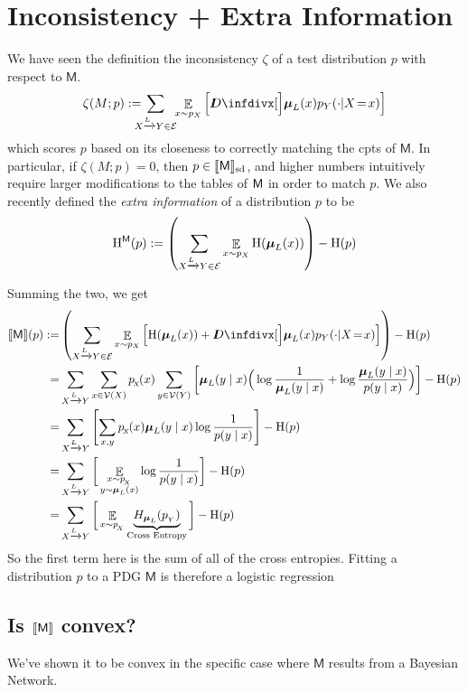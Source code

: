 \documentclass{article}
\newcommand{\bmu}{\boldsymbol{\mu}}
\newcommand{\V}{\mathcal V}
\newcommand{\Ed}{\mathcal E}
\newcommand{\sfM}{\mathsf M}
\newcommand\SD{_{\text{sd}}}
\begin{document}
    \section{Inconsistency + Extra Information}
    We have seen the definition the inconsistency $\zeta$ of a test distribution $p$ with respect to $\sfM$.
    \[
        \zeta(M ; p) := %
        \!\!\!\!\!\sum_{ X \xrightarrow{\!\!L} Y  \in \Ed }\!\! \mathop{\mathbb E}_{x \sim p_X} \left[\kldiv[\Big]{\bmu_{L}(x) }{ p_Y(\cdot | X \!=\! x) } \right]
    \] 
    which scores $p$ based on its closeness to correctly matching the cpts of $\sfM$. In particular, if $\zeta(M;p) = 0$, then $p \in \bbr{\sfM}\SD$, and higher numbers intuitively require larger modifications to the tables of $\sf M$ in order to match $p$.     
    We also recently defined the \emph{extra information} of a distribution $p$ to be
    \[ \H^{\sfM}(p) := \left(\sum_{ X \xrightarrow{\!\!L} Y  \in \Ed } \E_{x \sim p_X}  \H (\bmu_L (x)) \right) - \H(p) \] 
    
    Summing the two, we get 
    \begin{align*}
         \bbr{\sfM}(p) :=& \left(\sum_{ X \xrightarrow{\!\!L} Y  \in \Ed } \E_{x \sim p_X}  \left[ \H (\bmu_L (x)) +\kldiv[\Big]{\bmu_{L}(x) }{ p_Y(\cdot | X \!=\! x) }  \right] \right) - \H(p) \\
         =& \sum_{ X \xrightarrow{\!\!L} Y } \sum_{x \in \V(X)} p_{\!_X}\!(x) \sum_{y \in \V(Y)}  \left[ \bmu_L (y\mid x) \Big(\log \frac{1}{\bmu_L(y \mid x)} + \log \frac{\bmu_L(y \mid x)}{p(y \mid x)}\Big)  \right]  - \H(p) \\
         =& \sum_{ X \xrightarrow{\!\!L} Y} \left[ \sum_{x, y }   p_{\!_X}\!(x) \bmu_L (y\mid x) \log \frac{1}{p(y \mid x)}  \right]  - \H(p) \\
         =& \sum_{ X \xrightarrow{\!\!L} Y} \bigg[ \E_{\substack{x \sim p_{\!_X} \\[-0.0em] y \sim \bmu_L(x)}} \log \frac{1}{p(y \mid x)}  \bigg]  - \H(p) \\
         =& \sum_{ X \xrightarrow{\!\!L} Y} \bigg[ \E_{x \sim p_{\!_X}} \underbrace{H_{\bmu_L} (p_{_Y})}_{\text{Cross Entropy}}  \bigg]  - \H(p ) \\
    \end{align*}
    So the first term here is the sum of all of the cross entropies.
    Fitting a distribution $p$ to a PDG $\sfM$ is therefore a logistic regression 
    
    
    \subsection*{Is $\bbr{\sfM}$ convex?} 
    We've shown it to be convex in the specific case where $\sfM$ results from a Bayesian Network.
    
    
    
    \section{}
    
\end{document}
